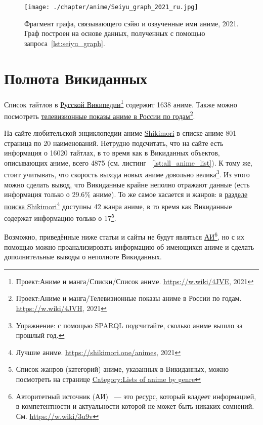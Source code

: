 \newpage
\begin{fullwidth}
\begin{figure*}[h]
	\texttt{[image: ./chapter/anime/Seiyu\_graph\_2021\_ru.jpg]}
	\caption[Граф сэйю и аниме, 2021.]{Фрагмент графа, связывающего сэйю и озвученные ими аниме, 2021. Граф построен на основе данных, полученных с помощью запроса~\protect\ref{lst:seiyu_graph}.}%
      \label{fig:Seiyu_graph_2021_ru}%
\end{figure*} 
\end{fullwidth}

\section{Полнота Викиданных}

Список тайтлов в \href{https://w.wiki/4JVE}{Русской Википедии}\footnote{Проект:Аниме и манга/Списки/Список аниме. \href{https://w.wiki/4JVE}{https://w.wiki/4JVE}, 2021} содержит \num{1638} аниме. Также можно посмотреть \href{https://w.wiki/4JVH}{телевизионные показы аниме в России по годам}\footnote{Проект:Аниме и манга/Телевизионные показы аниме в России по годам. \href{https://w.wiki/4JVH}{https://w.wiki/4JVH}, 2021}.

На сайте любительской энциклопедии аниме \href{https://shikimori.one/}{Shikimori} в списке аниме \num{801} страница по \num{20} наименований. Нетрудно подсчитать, что на сайте есть информация о \num{16020} тайтлах, в то время как в Викиданных объектов, описывающих аниме, всего \num{4875} (см. листинг ~\protect\ref{lst:all_anime_list}). К тому же, стоит учитывать, что скорость выхода новых аниме довольно велика\footnote{Упражнение: с помощью SPARQL подсчитайте, сколько аниме вышло за прошлый год.}. Из этого можно сделать вывод, что Викиданные крайне неполно отражают данные (есть информация только о \num{29.6}\% аниме). То же самое касается и жанров: в \href{https://shikimori.one/animes}{разделе поиска Shikimori}\footnote{Лучшие аниме. \href{https://shikimori.one/animes}{https://shikimori.one/animes}, 2021} доступны \num{42} жанра аниме, в то время как Викиданные содержат информацию только о \num{17}\footnote{Список жанров (категорий) аниме, указанных в Викиданных, можно посмотреть на странице \href{https://en.wikipedia.org/wiki/Category:Lists\_of_anime\_by\_genre}{Category:Lists of anime by genre}}.

Возможно, приведённые ниже статьи и сайты не будут являться \href{https://w.wiki/3u9v}{АИ}\footnote{Авторитетный источник (АИ) ~--- это ресурс, который владеет информацией, в компетентности и актуальности которой не может быть никаких сомнений. См. \href{https://w.wiki/3u9v}{https://w.wiki/3u9v}}, но с их помощью можно проанализировать информацию об имеющихся аниме и сделать дополнительные выводы о неполноте Викиданных.

